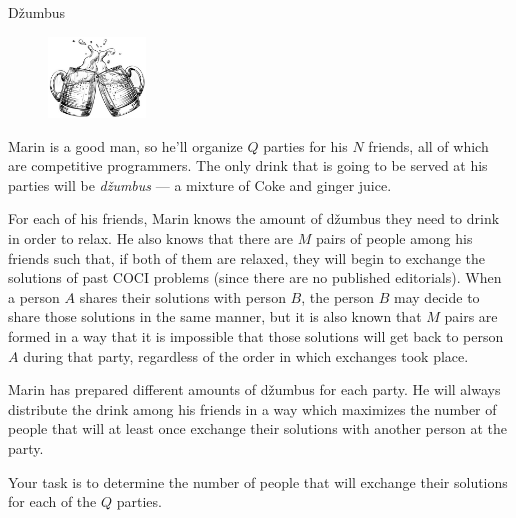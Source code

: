 \begin{statement}[
  problempoints=110,
  timelimit=1 sekunda,
  memorylimit=512 MiB,
]{Džumbus}

\setlength\intextsep{-0.1cm}
\begin{figure}
\centering
\includegraphics[width=0.23\textwidth]{img/dzumbus.png}
\end{figure}


Marin is a good man, so he'll organize $Q$ parties for his $N$ friends, all of
which are competitive programmers. The only drink that is going to be served at
his parties will be \textit{džumbus} --- a mixture of Coke and ginger juice.

For each of his friends, Marin knows the amount of džumbus they need to
drink in order to relax. He also knows that there are $M$ pairs of people among
his friends such that, if both of them are relaxed, they will begin to
exchange the solutions of past COCI problems (since there are no
published editorials). When a person $A$ shares their solutions with person $B$,
the person $B$ may decide to share those solutions in the same manner, but it is
also known that $M$ pairs are formed in a way that it is impossible that those
solutions will get back to person $A$ during that party, regardless of the order in
which exchanges took place.

Marin has prepared different amounts of džumbus for each party. He will
always distribute the drink among his friends in a way which maximizes the
number of people that will at least once exchange their solutions with another
person at the party.

Your task is to determine the number of people that will exchange their
solutions for each of the $Q$ parties.

\end{statement}
